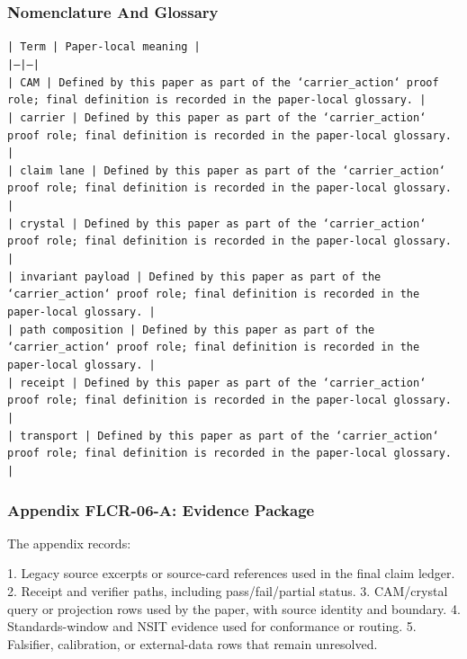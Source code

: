 \documentclass[11pt]{article}
\begin{document}
\subsubsection*{Nomenclature And Glossary}

\noindent\texttt{| Term | Paper-local meaning |}\\
\noindent\texttt{|---|---|}\\
\noindent\texttt{| CAM | Defined by this paper as part of the `carrier\_action` proof role; final definition is recorded in the paper-local glossary. |}\\
\noindent\texttt{| carrier | Defined by this paper as part of the `carrier\_action` proof role; final definition is recorded in the paper-local glossary. |}\\
\noindent\texttt{| claim lane | Defined by this paper as part of the `carrier\_action` proof role; final definition is recorded in the paper-local glossary. |}\\
\noindent\texttt{| crystal | Defined by this paper as part of the `carrier\_action` proof role; final definition is recorded in the paper-local glossary. |}\\
\noindent\texttt{| invariant payload | Defined by this paper as part of the `carrier\_action` proof role; final definition is recorded in the paper-local glossary. |}\\
\noindent\texttt{| path composition | Defined by this paper as part of the `carrier\_action` proof role; final definition is recorded in the paper-local glossary. |}\\
\noindent\texttt{| receipt | Defined by this paper as part of the `carrier\_action` proof role; final definition is recorded in the paper-local glossary. |}\\
\noindent\texttt{| transport | Defined by this paper as part of the `carrier\_action` proof role; final definition is recorded in the paper-local glossary. |}\\

\subsubsection*{Appendix FLCR-06-A: Evidence Package}

The appendix records:

1. Legacy source excerpts or source-card references used in the final claim ledger.
2. Receipt and verifier paths, including pass/fail/partial status.
3. CAM/crystal query or projection rows used by the paper, with source identity and boundary.
4. Standards-window and NSIT evidence used for conformance or routing.
5. Falsifier, calibration, or external-data rows that remain unresolved.
\end{document}
